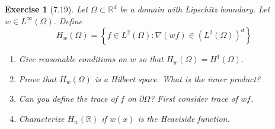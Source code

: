\documentclass[letterpaper,twoside,11pt]{article}
\theoremstyle{mystyle}
\newtheorem*{exercise}{Exercise}
\newcommand{\R}{{\mathbb R}}
\begin{document}
\begin{exercise}[7.19]
  Let $\Omega \subset \R^d$ be a domain with Lipschitz boundary. Let $w\in L^\infty \left( \Omega \right)$. Define 
  \[H_w\left( \Omega \right) = \left\{f \in L^2 (\Omega) : \nabla \left( wf \right) \in \left( L^2(\Omega) \right)^d\right\}\]
\begin{enumerate}
  \item Give reasonable conditions on $w$ so that $H_w\left( \Omega \right) = H^1 \left( \Omega \right)$. 
  \item Prove that $H_w\left( \Omega \right)$ is a Hilbert space. What is the inner product? 
  \item Can you define the trace of $f$ on $\partial \Omega$? First consider trace of $wf$. 
  \item Characterize $H_w\left( \R \right)$ if $w(x)$ is the Heaviside function. 
\end{enumerate}
\end{exercise}
\end{document}
